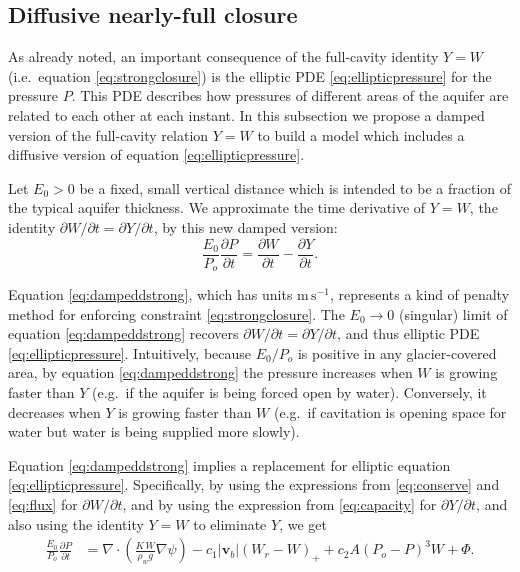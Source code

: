 \documentclass[11pt,final]{amsart}%
\newcommand\bv{\mathbf{v}}
\newcommand{\Div}{\nabla\cdot}
\newcommand{\grad}{\nabla}
\begin{document}
\subsection*{Diffusive nearly-full closure}  As already noted, an important consequence of the full-cavity identity $Y=W$ (i.e.~equation \eqref{eq:strongclosure}) is the elliptic PDE \eqref{eq:ellipticpressure} for the pressure $P$.  This PDE describes how pressures of different areas of the aquifer are related to each other at each instant.  In this subsection we propose a damped version of the full-cavity relation $Y=W$ to build a model which includes a diffusive version of equation \eqref{eq:ellipticpressure}.

Let $E_0>0$ be a fixed, small vertical distance which is intended to be a fraction of the typical aquifer thickness.  We approximate the time derivative of $Y=W$, the identity $\partial W/\partial t = \partial Y/\partial t$, by this new damped version:
\begin{equation}
\frac{E_0}{P_o} \frac{\partial P}{\partial t} =  \frac{\partial W}{\partial t}  - \frac{\partial Y}{\partial t}.\label{eq:dampeddstrong}
\end{equation}

Equation \eqref{eq:dampeddstrong}, which has units $\text{m}\,\text{s}^{-1}$, represents a kind of penalty method for enforcing constraint \eqref{eq:strongclosure}.  The $E_0\to 0$ (singular) limit of equation \eqref{eq:dampeddstrong} recovers $\partial W/\partial t = \partial Y/\partial t$, and thus elliptic PDE \eqref{eq:ellipticpressure}.  Intuitively, because $E_0/P_o$ is positive in any glacier-covered area, by equation \eqref{eq:dampeddstrong} the pressure increases when $W$ is growing faster than $Y$ (e.g.~if the aquifer is being forced open by water).  Conversely, it decreases when $Y$ is growing faster than $W$ (e.g.~if cavitation is opening space for water but water is being supplied more slowly).

Equation \eqref{eq:dampeddstrong} implies a replacement for elliptic equation \eqref{eq:ellipticpressure}.  Specifically, by using the expressions from \eqref{eq:conserve} and \eqref{eq:flux} for $\partial W/\partial t$, and by using the expression from \eqref{eq:capacity} for $\partial Y/\partial t$, and also using the identity $Y=W$ to eliminate $Y$, we get
\begin{align}
\frac{E_0}{P_o} \frac{\partial P}{\partial t} &= \Div \left(\frac{K\,W}{\rho_w g} \grad \psi\right) - c_1 |\bv_b| (W_r - W)_+  + c_2 A (P_o - P)^3 W  + \Phi. \label{eq:diffusionpressure}
\end{align}
\end{document}
